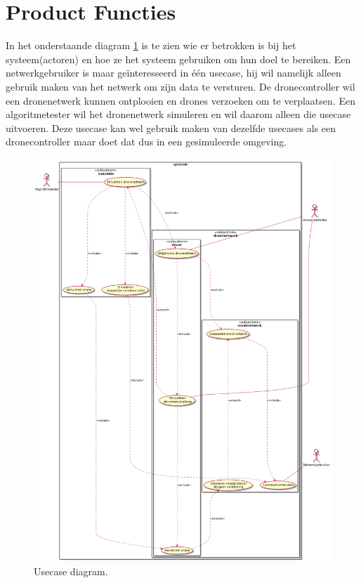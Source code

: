 \documentclass[a4paper, 11pt, oneside]{report}
\begin{document}
\section{Product Functies}
\label{inleiding:productfuncties}
In het onderstaande diagram \ref{fig:usecasediagram} is te zien wie er betrokken is bij het systeem(actoren) en hoe ze het systeem gebruiken om hun doel te bereiken.
Een netwerkgebruiker is maar geïnteresseerd in één usecase, hij wil namelijk alleen gebruik maken van het netwerk om zijn data te versturen.
De dronecontroller wil een dronenetwerk kunnen ontplooien en drones verzoeken om te verplaatsen.
Een algoritmetester wil het dronenetwerk simuleren en wil daarom alleen die usecase uitvoeren.
Deze usecase kan wel gebruik maken van dezelfde usecases als een dronecontroller maar doet dat dus in een gesimuleerde omgeving. 
\begin{figure}[H]
	\begin{center}\includegraphics[width=1\linewidth]{UML/out/usecase/usecasediagram/usecasediagram.png}\end{center}
	\caption{Usecase diagram.}
	\label{fig:usecasediagram}
\end{figure}
\end{document}
